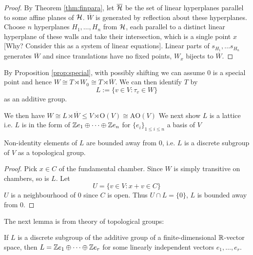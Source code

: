 \documentclass[../main.tex]{subfiles}
\begin{document}
\begin{proof}
    By Theorem \ref{thm:finpara}, let $\overline {\mathcal{H}}$ be the set of linear hyperplanes parallel to some affine planes of $\mathcal{H}$. $\overline W$ is generated by reflection about these hyperplanes.  Choose $n$ hyperplanes $H_1,\dots,H_n$ from $\mathcal{H}$, each parallel to a distinct linear hyperplane of these walls and take their intersection, which is a single point $x$ [Why? Consider this as a system of linear equations]. Linear parts of $s_{H_1},\dots s_{H_n}$ generates $\overline W$ and since translations have no fixed points, $W_x$ bijects to $\overline W$.
\end{proof}

By Proposition \ref{prop:special}, with possibly shifting we can assume $0$ is a special point and hence $W\cong T\rtimes W_0\cong T \rtimes \overline W$. We can then identify $T$ by \[
L := \{v \in V : \tau_v \in W\}
\]
as an additive group. 

We then have $W\cong L\rtimes \overline W\leq V \rtimes \text{O}(V)\cong \text{AO}(V)$
We next show $L$ is a lattice i.e.   $L$ is in the form of $\mathbb{Z} e_1\oplus \dots \oplus \mathbb{Z} e_n$ for $\{e_i\}_{1\leq i\leq n}$ a basis of $V$


\begin{lemma}
    Non-identity elements of $L$ are bounded away from $0$, i.e. $L$ is a discrete subgroup of $V$ as a topological group. 
\end{lemma}

\begin{proof}
    Pick $x\in C$ of the fundamental chamber. Since $W$ is simply transitive on chambers, so is $L$. Let \[U=\{v\in V:x+v \in C\}\]
    $U$ is a neighbourhood of $0$ since $C$ is open. Thus $U\cap L=\{0\}$, $L$ is bounded away from $0$.
\end{proof}

The next lemma is from theory of topological groups:

\begin{lemma}\label{lem:latt}
    If $L$ is a discrete subgroup of the additive group of a finite-dimensional $\mathbb{R}$-vector space, then $L=\mathbb{Z} e_1\oplus\dots\oplus \mathbb{Z} e_r$ for some linearly independent vectors $e_1,\dots,e_r$. 
\end{lemma}
\end{document}
